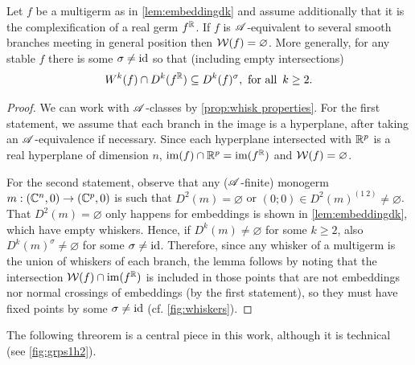 \documentclass[a4paper,12pt]{amsart}
\begin{document}
\begin{lemma}\label{cor:whisk diagonal}
Let $f$ be a multigerm as in \cref{lem:embeddingdk} and assume additionally that it is the complexification of a real germ $f^{\mathbb{R}}$. If $f$ is $\mathscr{A}$-equivalent to several smooth branches meeting in general position then $\mathcal{W}(f)=\varnothing$. More generally, for any stable $f$ there is some $\sigma\neq\operatorname{id}$ so that (including empty intersections)
\[W^k(f)\cap D^k(f^{\mathbb{R}})\subseteq D^k(f)^\sigma, \text{ for all } \, k\geq 2.\]
\end{lemma}
\begin{proof}
We can work with $\mathscr{A}$-classes by \cref{prop:whisk properties}.
For the first statement, we assume that each branch in the image is a hyperplane, after taking an $\mathscr{A}$-equivalence if necessary. Since each hyperplane intersected with $\mathbb{R}^p$ is a real hyperplane of dimension $n$, $\operatorname{im}(f)\cap\mathbb{R}^p=\operatorname{im}(f^{\mathbb{R}})$ and $\mathcal{W}(f)=\varnothing$.

For the second statement, observe that any ($\mathscr{A}$-finite) monogerm $m:(\mathbb{C}^n,0)\to(\mathbb{C}^p,0)$ is such that $D^2(m)=\varnothing$ or $(0;0)\in D^2(m)^{(1\:2)}\neq\varnothing$. That $D^2(m)=\varnothing$ only happens for embeddings is shown in \cref{lem:embeddingdk}, which have empty whiskers.
 Hence, if $D^k(m)\neq\varnothing$ for some $k\geq2$, also $D^k(m)^\sigma\neq\varnothing$ for some $\sigma\neq\operatorname{id}$. Therefore, since any whisker of a multigerm is the union of whiskers of each branch, the lemma follows by noting that the intersection $\mathcal{W}(f)\cap\operatorname{im}(f^{\mathbb{R}})$ is included in those points that are not embeddings nor normal crossings of embeddings (by the first statement), so they must have fixed points by some $\sigma\neq\operatorname{id}$ (cf. \cref{fig:whiskers}).
\end{proof}


The following threorem is a central piece in this work, although it is technical (see \cref{fig:grps1h2}).
\end{document}
